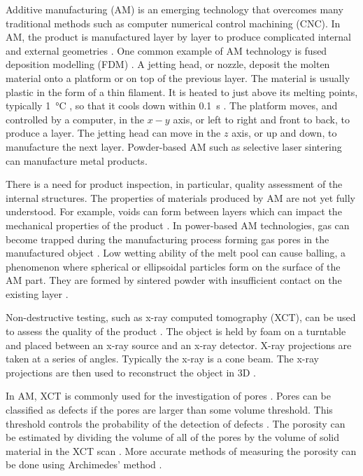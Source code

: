 \documentclass{article}
\begin{document}
Additive manufacturing (AM) is an emerging technology that overcomes many traditional methods such as computer numerical control machining (CNC). In AM, the product is manufactured layer by layer to produce complicated internal and external geometries \citep{ngo2018additive, wong2012review}. One common example of AM technology is fused deposition modelling (FDM) \citep{crump1991fused, crump1992apparatus, stratasys2019what}. A jetting head, or nozzle, deposit the molten material onto a platform or on top of the previous layer. The material is usually plastic in the form of a thin filament. It is heated to just above its melting points, typically \SI{1}{\degreeCelsius} \citep{crump1992apparatus}, so that it cools down within \SI{0.1}{\second} \citep{kruth1991material}. The platform moves, and controlled by a computer, in the $x-y$ axis, or left to right and front to back, to produce a layer. The jetting head can move in the $z$ axis, or up and down, to manufacture the next layer. Powder-based AM such as selective laser sintering \citep{3d2019our, deckard1989method, dtm1990the} can manufacture metal products.

There is a need for product inspection, in particular, quality assessment of the internal structures. The properties of materials produced by AM are not yet fully understood. For example, voids can form between layers which can impact the mechanical properties of the product \citep{ngo2018additive, wang20173d}. In power-based AM technologies, gas can become trapped during the manufacturing process forming gas pores in the manufactured object \citep{tammas2015xct, thijs2010study}. Low wetting ability of the melt pool can cause balling, a phenomenon where spherical or ellipsoidal particles form on the surface of the AM part. They are formed by sintered powder with insufficient contact on the existing layer \citep{gu2009balling, li2012balling}.

Non-destructive testing, such as x-ray computed tomography (XCT), can be used to assess the quality of the product \citep{kruth2011computed, sun2012overview}. The object is held by foam on a turntable and placed between an x-ray source and an x-ray detector. X-ray projections are taken at a series of angles. Typically the x-ray is a cone beam. The x-ray projections are then used to reconstruct the object in 3D \citep{brooks1976principles, feldkamp1984practical, smith1990cone}.

In AM, XCT is commonly used for the investigation of pores \citep{thompson2016x}. Pores can be classified as defects if the pores are larger than some volume threshold. This threshold controls the probability of the detection of defects \citep{amrhein2014characterization, gandossi2010probability}. The porosity can be estimated by dividing the volume of all of the pores by the volume of solid material in the XCT scan \citep{taud2005porosity}. More accurate methods of measuring the porosity can be done using Archimedes' method \citep{spierings2011comparison}.
\end{document}
